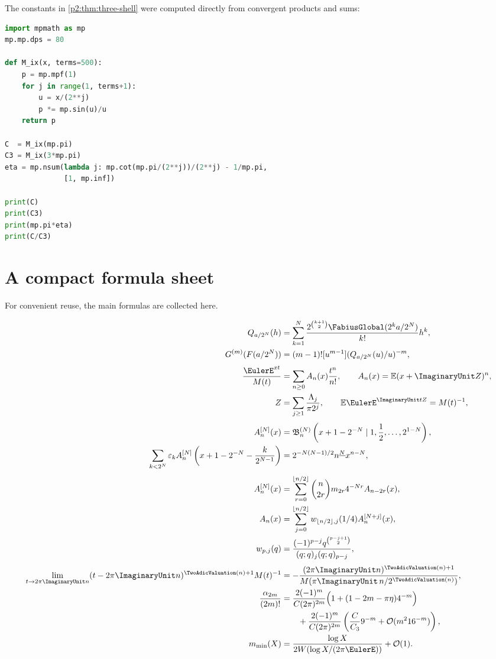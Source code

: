 \documentclass[11pt,oneside]{article}
\numberwithin{equation}{section}
\theoremstyle{definition}
\theoremstyle{remark}
\newcommand{\eps}{\varepsilon}
\begin{document}
The constants in \cref{p2:thm:three-shell} were computed directly from convergent products and sums:
\begin{lstlisting}[style=frontiercode,language=Python,caption={High-precision evaluation of the pole constants.}]
import mpmath as mp
mp.mp.dps = 80

def M_ix(x, terms=500):
    p = mp.mpf(1)
    for j in range(1, terms+1):
        u = x/(2**j)
        p *= mp.sin(u)/u
    return p

C  = M_ix(mp.pi)
C3 = M_ix(3*mp.pi)
eta = mp.nsum(lambda j: mp.cot(mp.pi/(2**j))/(2**j) - 1/mp.pi,
              [1, mp.inf])

print(C)
print(C3)
print(mp.pi*eta)
print(C/C3)
\end{lstlisting}

\section{A compact formula sheet}
\label{p2:app:formula-sheet}

For convenient reuse, the main formulas are collected here.

\begin{align*}
 Q_{a/2^N}(h)
 &=\sum_{k=1}^{N}
 \frac{2^{\binom{k+1}{2}}\FabiusGlobal(2^ka/2^N)}{k!}h^k,\\
 G^{(m)}(F(a/2^N))
 &=(m-1)![u^{m-1}](Q_{a/2^N}(u)/u)^{-m},\\[0.3em]
 \frac{\EulerE^{xt}}{M(t)}
 &=\sum_{n\ge0}A_n(x)\frac{t^n}{n!},
 \qquad
 A_n(x)=\mathbb E(x+\ImaginaryUnit Z)^n,\\
 Z&=\sum_{j\ge1}\frac{\Lambda_j}{\pi2^j},
 \qquad
 \mathbb E\EulerE^{\ImaginaryUnit tZ}=M(t)^{-1},\\[0.3em]
 A_n^{[N]}(x)
 &=\mathfrak B_n^{(N)}
 \left(x+1-2^{-N}\mid1,\frac12,\ldots,2^{1-N}\right),\\
 \sum_{k<2^N}\eps_k
 A_n^{[N]}\left(x+1-2^{-N}-\frac{k}{2^{N-1}}\right)
 &=2^{-N(N-1)/2}\fall nN x^{n-N},\\[0.3em]
 A_n^{[N]}(x)
 &=\sum_{r=0}^{\lfloor n/2\rfloor}
 \binom n{2r}m_{2r}4^{-Nr}A_{n-2r}(x),\\
 A_n(x)
 &=\sum_{j=0}^{\lfloor n/2\rfloor}
 w_{\lfloor n/2\rfloor,j}(1/4)A_n^{[N+j]}(x),\\
 w_{p,j}(q)
 &=\frac{(-1)^{p-j}q^{\binom{p-j+1}{2}}}
 {(q;q)_j(q;q)_{p-j}},\\[0.3em]
 \lim_{t\to2\pi\ImaginaryUnit n}(t-2\pi\ImaginaryUnit n)^{\TwoAdicValuation(n)+1}M(t)^{-1}
 &=-\frac{(2\pi\ImaginaryUnit n)^{\TwoAdicValuation(n)+1}}
 {M(\pi\ImaginaryUnit\,n/2^{\TwoAdicValuation(n)})},\\
 \frac{\alpha_{2m}}{(2m)!}
 &=\frac{2(-1)^m}{C(2\pi)^{2m}}
 \Bigl(1+(1-2m-\pi\eta)4^{-m}\Bigr)\\
 &\qquad+\frac{2(-1)^m}{C(2\pi)^{2m}}
 \left(\frac C{C_3}9^{-m}+\BigO(m^2 16^{-m})\right),\\
 m_{\min}(X)
 &=\frac{\log X}{2W(\log X/(2\pi\EulerE))}+\BigO(1).
\end{align*}
\end{document}
